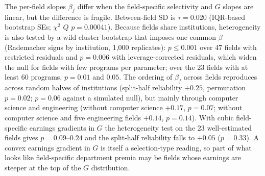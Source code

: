 \documentclass[11pt]{article}
\begin{document}
The per-field slopes $\beta_f$ differ when the field-specific selectivity and $G$ slopes are linear, but the
difference is fragile.
Between-field SD is $\tau=0.020$ (IQR-based bootstrap SEs; $\chi^2$ $Q$ $p=0.00041$). Because fields share
institutions, heterogeneity is also tested by a wild cluster bootstrap that imposes one common $\beta$
(Rademacher signs by institution, 1,000 replicates): $p\le0.001$ over 47 fields with restricted residuals and
$p=0.006$ with leverage-corrected residuals, which widen the null for fields with few programs per parameter;
over the 23 fields with at least 60 programs, $p=0.01$ and $0.05$. The ordering of $\beta_f$ across fields
reproduces across random halves of institutions (split-half reliability $+0.25$, permutation $p=0.02$; $p=0.06$
against a simulated null), but mainly through computer science and engineering (without computer science
$+0.17$, $p=0.07$; without computer science and five engineering fields $+0.14$, $p=0.14$). With cubic
field-specific earnings gradients in $G$ the heterogeneity test on the 23 well-estimated fields gives
$p=0.09$--$0.24$ and the split-half reliability falls to $+0.05$ ($p=0.33$). A convex earnings gradient in $G$ is
itself a selection-type reading, so part of what looks like field-specific department premia may be fields whose
earnings are steeper at the top of the $G$ distribution.
\end{document}
